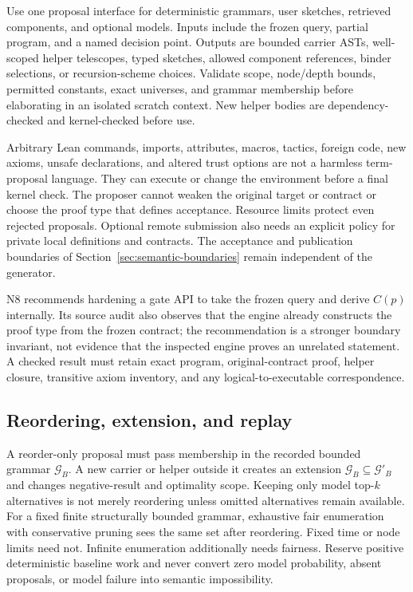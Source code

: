 Use one proposal interface for deterministic grammars, user sketches, retrieved components, and optional models. Inputs include the frozen query, partial program, and a named decision point. Outputs are bounded carrier ASTs, well-scoped helper telescopes, typed sketches, allowed component references, binder selections, or recursion-scheme choices. Validate scope, node/depth bounds, permitted constants, exact universes, and grammar membership before elaborating in an isolated scratch context. New helper bodies are dependency-checked and kernel-checked before use.

Arbitrary Lean commands, imports, attributes, macros, tactics, foreign code, new axioms, unsafe declarations, and altered trust options are not a harmless term-proposal language. They can execute or change the environment before a final kernel check. The proposer cannot weaken the original target or contract or choose the proof type that defines acceptance. Resource limits protect even rejected proposals. Optional remote submission also needs an explicit policy for private local definitions and contracts. The acceptance and publication boundaries of Section~\ref{sec:semantic-boundaries} remain independent of the generator.

N8 recommends hardening a gate API to take the frozen query and derive $C(p)$ internally. Its source audit also observes that the engine already constructs the proof type from the frozen contract; the recommendation is a stronger boundary invariant, not evidence that the inspected engine proves an unrelated statement. A checked result must retain exact program, original-contract proof, helper closure, transitive axiom inventory, and any logical-to-executable correspondence.

\subsection{Reordering, extension, and replay}\label{sec:learning-replay}

A reorder-only proposal must pass membership in the recorded bounded grammar $\mathcal G_B$. A new carrier or helper outside it creates an extension $\mathcal G_B\subseteq\mathcal G'_B$ and changes negative-result and optimality scope. Keeping only model top-$k$ alternatives is not merely reordering unless omitted alternatives remain available. For a fixed finite structurally bounded grammar, exhaustive fair enumeration with conservative pruning sees the same set after reordering. Fixed time or node limits need not. Infinite enumeration additionally needs fairness. Reserve positive deterministic baseline work and never convert zero model probability, absent proposals, or model failure into semantic impossibility.

